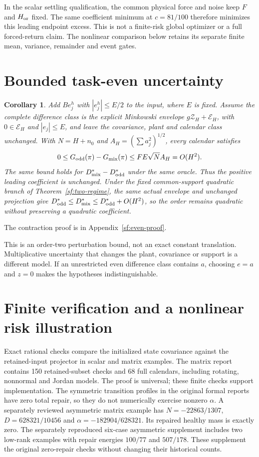 \documentclass[journal]{IEEEtran}
\newtheorem{corollary}{Corollary}
\begin{document}
In the scalar settling qualification, the common physical force and noise
keep $F$ and $H_{\rm or}$ fixed. The same coefficient minimum at $c=81/100$
therefore minimizes this leading endpoint excess. This is not a finite-risk
global optimizer or a full forced-return claim. The nonlinear comparison
below retains its separate finite mean, variance, remainder and event gates.

\section{Bounded task-even uncertainty}\label{sf:even-section}
\begin{corollary}\label{sf:even}
Add $Be_j^h$ with $|e_j^h|\le E/2$ to the input, where $E$ is fixed.
Assume the complete difference class is the explicit Minkowski envelope
$g\mathcal Z_H+\mathcal E_H$, with $0\in\mathcal E_H$ and
$|e_j|\le E$, and leave the covariance, plant and calendar class unchanged.
With $N=H+n_0$ and $A_H=(\sum a_j^2)^{1/2}$, every calendar satisfies
\[
0\le G_{\rm odd}(\pi)-G_{\rm mix}(\pi)
\le FE\sqrt N A_H=O(H^2).
\]
The same bound holds for $D_{\rm mix}^*-D_{\rm odd}^*$ under the same oracle.
Thus the positive leading coefficient is unchanged. Under the fixed
common-support quadratic branch of Theorem~\ref{sf:two-regime}, the same
actual envelope and unchanged projection give
$D_{\rm odd}^*\le D_{\rm mix}^*\le D_{\rm odd}^*+O(H^2)$,
so the order remains quadratic without preserving a quadratic coefficient.
\end{corollary}
The contraction proof is in Appendix~\ref{sf:even-proof}.

This is an order-two perturbation bound, not an exact constant translation.
Multiplicative uncertainty that changes the plant, covariance or support is a
different model. If an unrestricted even difference class contains $a$,
choosing $e=a$ and $z=0$ makes the hypotheses indistinguishable.

\section{Finite verification and a nonlinear risk illustration}\label{sf:verification}
Exact rational checks compare the initialized state covariance against the
retained-input projector in scalar and matrix examples. The matrix report
contains 150 retained-subset checks and 68 full calendars, including rotating,
nonnormal and Jordan models. The proof is universal; these finite checks
support implementation. The symmetric transition profiles in the original
formal reports have zero total repair, so they do not numerically exercise
nonzero $\alpha$. A separately reviewed asymmetric matrix example has
$N=-22863/1307$, $D=628321/10456$ and $\alpha=-182904/628321$.
Its repaired healthy mass is exactly zero. The separately reproduced
six-case asymmetric supplement includes two low-rank examples with repair
energies $100/77$ and $507/178$. These supplement the original zero-repair
checks without changing their historical counts.
\end{document}
